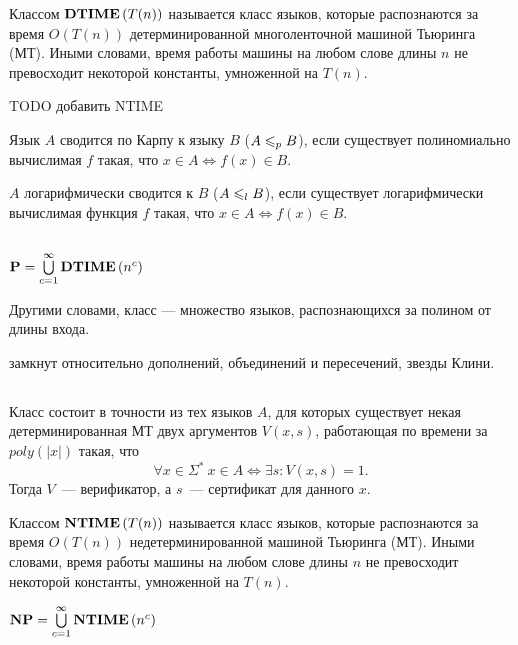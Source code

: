 \begin{definition}
Классом $\textbf{DTIME}\left({T(n)}\right)$ называется класс языков, которые распознаются за время $O(T(n))$ детерминированной многоленточной машиной Тьюринга (МТ). Иными словами, время работы машины на любом слове длины $n$ не превосходит некоторой константы, умноженной на $T(n)$.
\end{definition}

TODO добавить NTIME

\begin{definition}
Язык $A$ сводится по Карпу к языку $B$ ($A \leqslant_p B$), если существует полиномиально вычислимая $f$ такая, что $x \in A \Longleftrightarrow f(x) \in B$.
\end{definition}

\begin{definition}
$A$ логарифмически сводится к $B$ ($A \leqslant_l B$), если существует логарифмически вычислимая функция $f$ такая, что $x \in A \Longleftrightarrow f(x) \in B$.
\end{definition}

\subsection{\p}

\begin{definition}
$\textbf{P} = \bigcup\limits_{c=1}^{\infty}\textbf{DTIME}\left({n^c}\right)$

Другими словами, класс \p --- множество языков, распознающихся за полином от длины входа.
\end{definition}

\begin{note} 
\p замкнут относительно дополнений, объединений и пересечений, звезды Клини.
\end{note}

\subsection{\np}

\begin{definition}
Класс \np состоит в точности из тех языков $A$, для которых существует некая детерминированная МТ двух аргументов $V(x, s)$, работающая по времени за $poly(|x|)$ такая, что
$$
\forall x \in \Sigma^* \ x \in A \Longleftrightarrow \exists s: V(x, s) = 1.
$$
Тогда $V$~--- верификатор, а $s$~--- сертификат для данного $x$.
\end{definition}

\begin{definition}
Классом $\textbf{NTIME}\left({T(n)}\right)$ называется класс языков, которые распознаются за время $O(T(n))$ недетерминированной машиной Тьюринга (МТ). Иными словами, время работы машины на любом слове длины $n$ не превосходит некоторой константы, умноженной на $T(n)$.

$\textbf{NP} = \bigcup\limits_{c=1}^{\infty}\textbf{NTIME}\left({n^c}\right)$
\end{definition}

